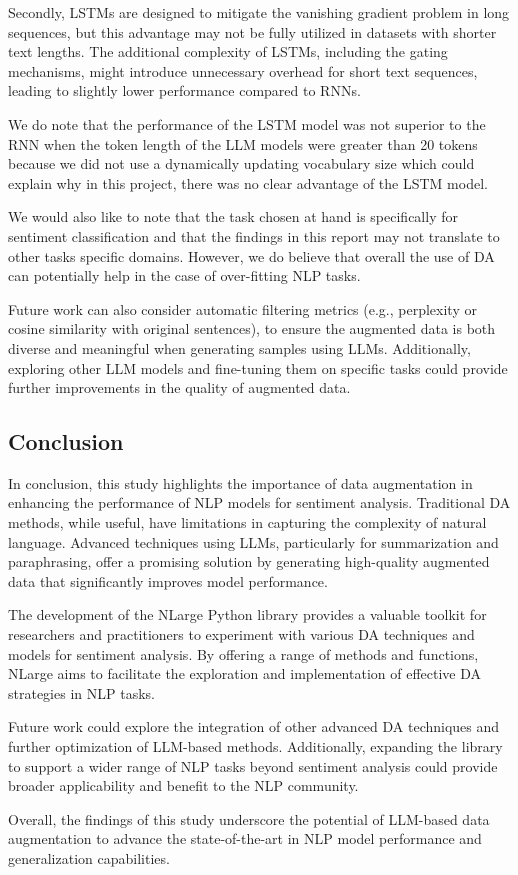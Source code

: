 \documentclass[10pt]{extarticle}
\begin{document}
Secondly, LSTMs are designed to mitigate the vanishing gradient problem in long
sequences, but this advantage may not be fully utilized in datasets with
shorter text lengths. The additional complexity of LSTMs, including the gating
mechanisms, might introduce unnecessary overhead for short text sequences,
leading to slightly lower performance compared to RNNs.

We do note that the performance of the LSTM model was not superior to the RNN
when the token length of the LLM models were greater than 20 tokens because we
did not use a dynamically updating vocabulary size which could explain why in
this project, there was no clear advantage of the LSTM model.

We would also like to note that the task chosen at hand is specifically for
sentiment classification and that the findings in this report may not translate
to other tasks specific domains. However, we do believe that overall the use of
DA can potentially help in the case of over-fitting NLP tasks.

Future work can also consider automatic filtering metrics (e.g., perplexity or
cosine similarity with original sentences), to ensure the augmented data is
both diverse and meaningful when generating samples using LLMs. Additionally,
exploring other LLM models and fine-tuning them on specific tasks could provide
further improvements in the quality of augmented data.

\subsection{Conclusion}

In conclusion, this study highlights the importance of data augmentation in
enhancing the performance of NLP models for sentiment analysis. Traditional DA
methods, while useful, have limitations in capturing the complexity of natural
language. Advanced techniques using LLMs, particularly for summarization and
paraphrasing, offer a promising solution by generating high-quality augmented
data that significantly improves model performance.

The development of the NLarge Python library provides a valuable toolkit for
researchers and practitioners to experiment with various DA techniques and
models for sentiment analysis. By offering a range of methods and functions,
NLarge aims to facilitate the exploration and implementation of effective DA
strategies in NLP tasks.

Future work could explore the integration of other advanced DA techniques and
further optimization of LLM-based methods. Additionally, expanding the library
to support a wider range of NLP tasks beyond sentiment analysis could provide
broader applicability and benefit to the NLP community.

Overall, the findings of this study underscore the potential of LLM-based data
augmentation to advance the state-of-the-art in NLP model performance and
generalization capabilities.

\newpage



\end{document}
